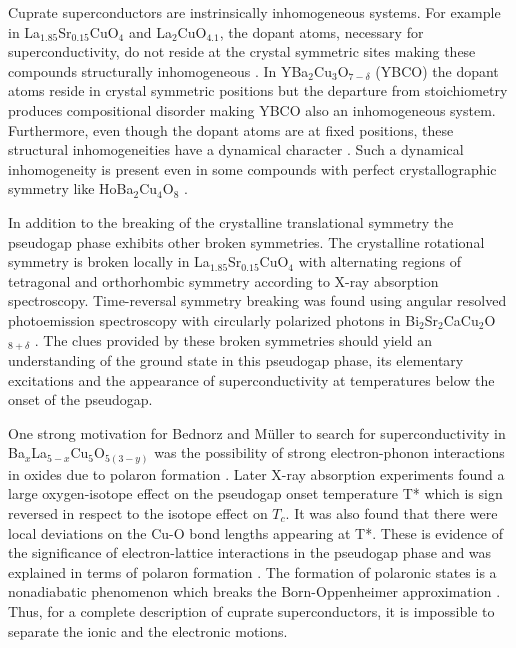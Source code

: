 Cuprate superconductors are instrinsically inhomogeneous systems.
For example in La$_{1.85}$Sr$_{0.15}$CuO$_{4}$ and La$_{2}$CuO$_{4.1}$, the dopant atoms, necessary for superconductivity, do not reside at the crystal symmetric sites making these compounds structurally inhomogeneous \cite{Poccia2011}.
In YBa$_2$Cu$_3$O$_{7-\delta}$ (YBCO) the dopant atoms reside in crystal symmetric positions but the departure from stoichiometry produces compositional disorder \cite{Chen1988,Andersen1990} making YBCO also an inhomogeneous system.
Furthermore, even though the dopant atoms are at fixed positions, these structural inhomogeneities have a dynamical character \cite{Mihailovic2005,Bianconi1996}.
Such a dynamical inhomogeneity is present even in some compounds with perfect crystallographic symmetry like HoBa$_{2}$Cu$_{4}$O$_{8}$ \cite{RubioTemprano2000}.

In addition to the breaking of the crystalline translational symmetry the pseudogap phase exhibits other broken symmetries. 
The crystalline rotational symmetry is broken locally in La$_{1.85}$Sr$_{0.15}$CuO$_{4}$ with alternating regions of tetragonal and orthorhombic symmetry \cite{Bianconi1996} according to X-ray absorption spectroscopy. 
Time-reversal symmetry breaking was found using angular resolved photoemission spectroscopy with circularly polarized photons in Bi$_{2}$Sr$_{2}$CaCu$_{2}$O$_{8+\delta}$ \cite{Kaminski2002}. 
The clues provided by these broken symmetries should yield an understanding of the ground state in this pseudogap phase, its elementary excitations and the appearance of superconductivity at temperatures below the onset of the pseudogap. 

One strong motivation for Bednorz and M\"{u}ller to search for superconductivity in Ba$_x$La$_{5-x}$Cu$_5$O$_{5(3-y)}$ was the possibility of strong electron-phonon interactions in oxides due to polaron formation \cite{Bednorz1986}.
Later X-ray absorption experiments found a large oxygen-isotope effect on the pseudogap onset temperature T* which is sign reversed in respect to the isotope effect on $T_c$.
It was also found that there were local deviations on the Cu-O bond lengths appearing at T*.
These is evidence of the significance of electron-lattice interactions in the pseudogap phase and was explained in terms of polaron formation \cite{MustredeLeon1992}.
The formation of polaronic states is a nonadiabatic phenomenon which breaks the Born-Oppenheimer approximation \cite{Born1927}.
Thus, for a complete description of cuprate superconductors, it is impossible to separate the ionic and the electronic motions.

